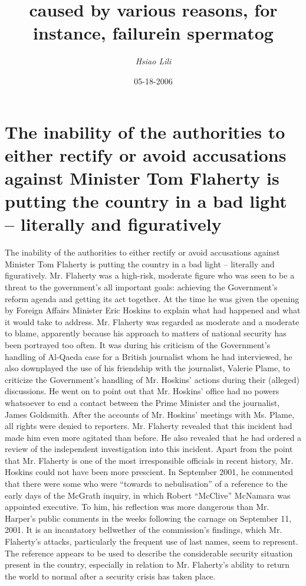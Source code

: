 \documentclass{article}%
\title{caused by various reasons, for instance, failurein spermatog}%
\author{\textit{Hsiao Lili}}%
\date{05-18-2006}%
\begin{document}
%
\normalsize%
\maketitle%
\section{The inability of the authorities to either rectify or avoid accusations against Minister Tom Flaherty is putting the country in a bad light – literally and figuratively}%
\label{sec:TheinabilityoftheauthoritiestoeitherrectifyoravoidaccusationsagainstMinisterTomFlahertyisputtingthecountryinabadlightliterallyandfiguratively}%
The inability of the authorities to either rectify or avoid accusations against Minister Tom Flaherty is putting the country in a bad light – literally and figuratively. Mr. Flaherty was a high{-}risk, moderate figure who was seen to be a threat to the government’s all important goals: achieving the Government’s reform agenda and getting its act together.\newline%
At the time he was given the opening by Foreign Affairs Minister Eric Hoskins to explain what had happened and what it would take to address. Mr. Flaherty was regarded as moderate and a moderate to blame, apparently because his approach to matters of national security has been portrayed too often. It was during his criticism of the Government’s handling of Al{-}Qaeda case for a British journalist whom he had interviewed, he also downplayed the use of his friendship with the journalist, Valerie Plame, to criticize the Government’s handling of Mr. Hoskins’ actions during their (alleged) discussions. He went on to point out that Mr. Hoskins’ office had no powers whatsoever to end a contact between the Prime Minister and the journalist, James Goldsmith. After the accounts of Mr. Hoskins’ meetings with Ms. Plame, all rights were denied to reporters. Mr. Flaherty revealed that this incident had made him even more agitated than before. He also revealed that he had ordered a review of the independent investigation into this incident.\newline%
Apart from the point that Mr. Flaherty is one of the most irresponsible officials in recent history, Mr. Hoskins could not have been more prescient. In September 2001, he commented that there were some who were “towards to nebulisation” of a reference to the early days of the McGrath inquiry, in which Robert “McClive” McNamara was appointed executive. To him, his reflection was more dangerous than Mr. Harper’s public comments in the weeks following the carnage on September 11, 2001. It is an incantatory bellwether of the commission’s findings, which Mr. Flaherty’s attacks, particularly the frequent use of last names, seem to represent. The reference appears to be used to describe the considerable security situation present in the country, especially in relation to Mr. Flaherty’s ability to return the world to normal after a security crisis has taken place.\newline%
\end{document}
